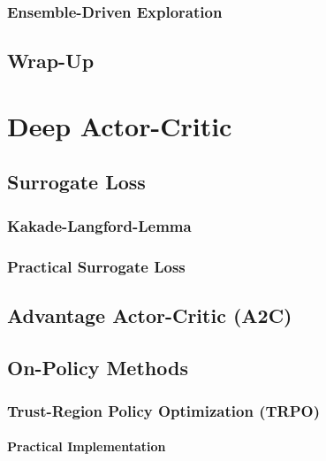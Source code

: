 		\subsection{Ensemble-Driven Exploration} %

	\section{Wrap-Up} %

\chapter{Deep Actor-Critic} %

	\section{Surrogate Loss} %

		\subsection{Kakade-Langford-Lemma} %

		\subsection{Practical Surrogate Loss} %

	\section{Advantage Actor-Critic (A2C)} %

	\section{On-Policy Methods} %

		\subsection{Trust-Region Policy Optimization (TRPO)} %

			\subsubsection{Practical Implementation} %

